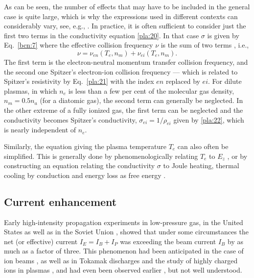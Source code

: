 \documentclass [12pt,a4paper,     ]{report} %
\begin{document}
   As can be seen, the number of effects that may have to be included in the general case is quite large, which is why the expressions used in different contexts can considerably vary, see, e.g., \cite{HAMME1979-, HAAN-1982-, JANNS1984-, GLAZY1991-, OLIVE1996-}.  In practice, it is often sufficient to consider just the first two terms in the conductivity equation \eqref{pla:20}.  In that case $\sigma$ is given by Eq.~\eqref{bcn:7} where the effective collision frequency $\nu$ is the sum of two terms \cite{MCART1973-}, i.e.,
%
\begin{equation}\label{pla:25} %
       \nu =  \nu_{en}(T_e,n_m)  +  \nu_{ei}(T_e,n_m).
\end{equation}
%
The first term is the electron-neutral momentum transfer collision frequency, and the second one Spitzer's electron-ion collision frequency --- which is related to Spitzer's resistivity by Eq.~\eqref{pla:21} with the index $en$ replaced by $ei$.  For dilute plasmas, in which $n_e$ is less than a few per cent of the molecular gas density, $n_m = 0.5 n_a$ (for a diatomic gas), the second term can generally be neglected.  In the other extreme of a fully ionized gas, the first term can be neglected and the conductivity becomes Spitzer's conductivity, $\sigma_{ei} = 1/\rho_{ei}$ given by \eqref{pla:22}, which is nearly independent of $n_e$.

   Similarly, the equation giving the plasma temperature $T_e$ can also often be simplified.  This is generally done by phenomenologically relating $T_e$ to $E_z$ \cite{CARY-1980-,CHAMB1981-}, or by constructing an equation relating the conductivity $\sigma$ to Joule heating, thermal cooling by conduction and energy loss as free energy \cite{YU---1979-}.
 
\subsection{Current enhancement}

   Early high-intensity propagation experiments in low-pressure gas, in the United States \cite{BRIGG1977-} as well as in the Soviet Union \cite{BREJZ1977-}, showed that under some circumstances the net (or effective) current $I_E = I_B + I_P$ was exceeding the beam current $I_B$ by as much as a factor of three.  This phenomenon had been anticipated in the case of ion beams \cite{SUDAN1976-}, as well as in Tokamak discharges and the study of highly charged ions in plasmas \cite[Refs.~11-12]{SUDAN1976-}, and had even been observed earlier \cite[Refs.~1-2]{IPATO1984-}, but not well understood.
\end{document}
